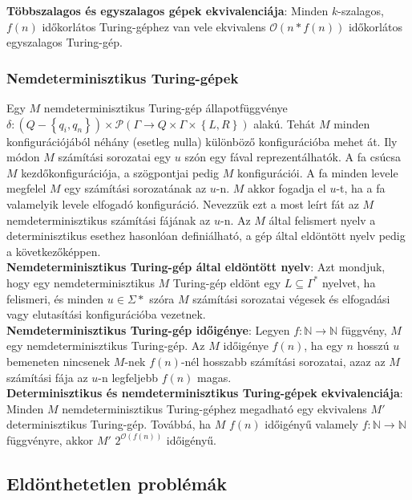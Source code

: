 \documentclass[margin=0px]{article}
\begin{document}
	\noindent \textbf{Többszalagos és egyszalagos gépek ekvivalenciája}: Minden $k$-szalagos, $f(n)$ időkorlátos Turing-géphez
	van vele ekvivalens $\mathcal{O}(n*f(n))$ időkorlátos egyszalagos Turing-gép.
	
	\subsubsection{Nemdeterminisztikus Turing-gépek}
	
	Egy $M$ nemdeterminisztikus Turing-gép állapotfüggvénye
	$\delta : (Q - \left\{q_{i},q_{n}\right\}) \times \mathcal{P}(\Gamma \to Q \times \Gamma \times \left\{L, R\right\})$
	alakú. Tehát $M$ minden konfigurációjából néhány (esetleg nulla) különböző konfigurációba mehet át.
	Ily módon $M$ számítási sorozatai egy $u$ szón egy fával reprezentálhatók. A fa csúcsa $M$ kezdőkonfigurációja,
	a szögpontjai pedig	$M$ konfigurációi. A fa minden levele megfelel $M$ egy számítási sorozatának az
	$u$-n. $M$ akkor fogadja el $u$-t, ha a fa valamelyik levele elfogadó konfiguráció.
	Nevezzük ezt a most leírt fát az $M$ nemdeterminisztikus számítási fájának az
	$u$-n. Az $M$ által felismert nyelv a determinisztikus esethez hasonlóan definiálható,
	a gép által eldöntött nyelv pedig a következőképpen.\\
	
	\noindent \textbf{Nemdeterminisztikus Turing-gép által eldöntött nyelv}: Azt mondjuk, hogy egy nemdeterminisztikus
	$M$ Turing-gép eldönt egy $L \subseteq \Gamma^{*}$ nyelvet, ha felismeri, és minden $u \in \Sigma{*}$ szóra
	$M$ számítási sorozatai végesek és elfogadási vagy elutasítási konfigurációba vezetnek.\\
	
	\noindent \textbf{Nemdeterminisztikus Turing-gép időigénye}: Legyen $f : \mathbb{N} \to \mathbb{N}$ függvény, $M$
	egy nemdeterminisztikus Turing-gép. Az $M$ időigénye $f(n)$, ha egy $n$ hosszú $u$ bemeneten nincsenek $M$-nek
	$f(n)$-nél hosszabb számítási sorozatai, azaz az $M$ számítási fája az $u$-n legfeljebb $f(n)$ magas.\\
	
	\noindent \textbf{Determinisztikus és nemdeterminisztikus Turing-gépek ekvivalenciája}:
	Minden $M$ nemdeterminisztikus Turing-géphez megadható egy ekvivalens $M'$ determinisztikus Turing-gép.
	Továbbá, ha $M$ $f(n)$ időigényű valamely $f : \mathbb{N} \to \mathbb{N}$ függvényre, akkor
	$M'$ $2^{\mathcal{O}(f(n))}$ időigényű.
	
	\subsection{Eldönthetetlen problémák}
	
\end{document}
